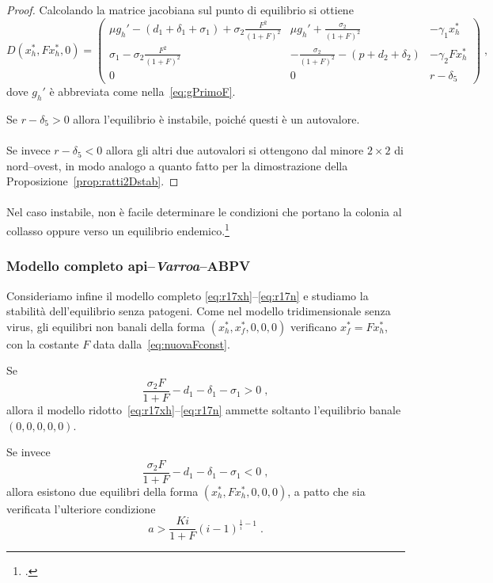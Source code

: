 \begin{proof}
Calcolando la matrice jacobiana sul punto di equilibrio si ottiene
$$ D (x_h^* , F x_h^* , 0) =
\begin{pmatrix}
    \mu g_h' - (d_1 +\delta_1 +\sigma_1) + \sigma_2 \frac{F^2}{(1+F)^2} &
    \mu g_h' + \frac{\sigma_2}{(1+F)^2} &
    -\gamma_1 x_h^*
    \\
    \sigma_1 - \sigma_2 \frac{F^2}{(1+F)^2} &
    - \frac{\sigma_2}{(1+F)^2} - ( p +d_2 +\delta_2) &
    - \gamma_2 F x_h^*
    \\
    0 &
    0 &
    r -\delta_5
    \end{pmatrix}
    \; ,
$$
dove $g_h'$ è abbreviata come nella~\eqref{eq:gPrimoF}.

Se $r -\delta_5 > 0$ allora l'equilibrio è instabile, poiché questi è un autovalore.

\paragraph{}
Se invece $r - \delta_5 <0$ allora gli altri due autovalori si ottengono dal minore $2 \times 2$
di nord--ovest, in modo analogo a quanto fatto
per la dimostrazione della Proposizione~\ref{prop:ratti2Dstab}.
\end{proof}

\paragraph{}
Nel caso instabile, non è facile determinare le condizioni che portano la colonia al collasso oppure
verso un equilibrio endemico.\footcite[15]{ratti2017}


\subsubsection{Modello completo api--\emph{Varroa}--ABPV}
Consideriamo infine il modello completo \eqref{eq:r17xh}--\eqref{eq:r17n} e studiamo la stabilità
dell'equilibrio senza patogeni.
Come nel modello tridimensionale senza virus, gli equilibri non banali della
forma $(x_h^*, x_f^*, 0,0,0)$ verificano $x_f^* = F x_h^*$, con
la costante $F$ data dalla~\eqref{eq:nuovaFconst}.

\begin{proposizione}
Se
$$\frac{\sigma_2 F}{1+F} - d_1 -\delta_1 -\sigma_1 > 0 \; ,$$
allora il modello ridotto~\eqref{eq:r17xh}--\eqref{eq:r17n} ammette
soltanto l'equilibrio banale $(0,0,0,0,0)$.

Se invece
$$\frac{\sigma_2 F}{1+F} - d_1 -\delta_1 -\sigma_1 < 0 \; ,$$
allora esistono due equilibri della forma $(x_h^*, F x_h^*, 0, 0, 0)$,
a patto che sia verificata l'ulteriore condizione
$$a > \frac{Ki}{1+F} {(i-1)}^{\frac{1}{i} -1} \; .$$
\label{prop:exist5D}
\end{proposizione}

